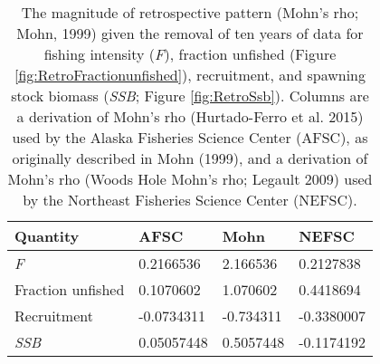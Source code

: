 
\begin{longtable}[t]{llll}
\caption{\label{tab:RetroMohnsrho}The magnitude of retrospective pattern (Mohn's rho; Mohn, 1999) given the removal of ten years of data for fishing intensity (\emph{F}), fraction unfished (Figure \ref{fig:RetroFractionunfished}),  recruitment, and spawning stock biomass (\emph{SSB}; Figure \ref{fig:RetroSsb}). Columns are a derivation of Mohn's rho (Hurtado-Ferro et al. 2015) used by the Alaska Fisheries Science Center (AFSC), as originally described in Mohn (1999), and a derivation of Mohn's rho (Woods Hole Mohn's rho; Legault 2009) used by the Northeast Fisheries Science Center (NEFSC).}\\
\toprule
Quantity & AFSC & Mohn & NEFSC\\
\midrule
\emph{F} & 0.2166536 & 2.166536 & 0.2127838\\
Fraction unfished & 0.1070602 & 1.070602 & 0.4418694\\
Recruitment & -0.0734311 & -0.734311 & -0.3380007\\
\emph{SSB} & 0.05057448 & 0.5057448 & -0.1174192\\
\bottomrule
\end{longtable}
